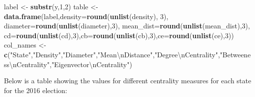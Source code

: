 \documentclass[]{article}
\newenvironment{Shaded}{\begin{snugshade}}{\end{snugshade}}
\newcommand{\KeywordTok}[1]{\textcolor[rgb]{0.13,0.29,0.53}{\textbf{#1}}}
\newcommand{\DataTypeTok}[1]{\textcolor[rgb]{0.13,0.29,0.53}{#1}}
\newcommand{\DecValTok}[1]{\textcolor[rgb]{0.00,0.00,0.81}{#1}}
\newcommand{\CharTok}[1]{\textcolor[rgb]{0.31,0.60,0.02}{#1}}
\newcommand{\StringTok}[1]{\textcolor[rgb]{0.31,0.60,0.02}{#1}}
\newcommand{\OtherTok}[1]{\textcolor[rgb]{0.56,0.35,0.01}{#1}}
\newcommand{\OperatorTok}[1]{\textcolor[rgb]{0.81,0.36,0.00}{\textbf{#1}}}
\newcommand{\NormalTok}[1]{#1}
\begin{document}
\begin{Shaded}
\begin{Highlighting}[]
\NormalTok{label <-}\StringTok{ }\KeywordTok{substr}\NormalTok{(y,}\DecValTok{1}\NormalTok{,}\DecValTok{2}\NormalTok{)}
\NormalTok{table <-}\StringTok{ }\KeywordTok{data.frame}\NormalTok{(label,}\DataTypeTok{density=}\KeywordTok{round}\NormalTok{(}\KeywordTok{unlist}\NormalTok{(density), }\DecValTok{3}\NormalTok{), }\DataTypeTok{diameter=}\KeywordTok{round}\NormalTok{(}\KeywordTok{unlist}\NormalTok{(diameter),}\DecValTok{3}\NormalTok{), }\DataTypeTok{mean_dist=}\KeywordTok{round}\NormalTok{(}\KeywordTok{unlist}\NormalTok{(mean_dist),}\DecValTok{3}\NormalTok{), }\DataTypeTok{cd=}\KeywordTok{round}\NormalTok{(}\KeywordTok{unlist}\NormalTok{(cd),}\DecValTok{3}\NormalTok{),}\DataTypeTok{cb=}\KeywordTok{round}\NormalTok{(}\KeywordTok{unlist}\NormalTok{(cb),}\DecValTok{3}\NormalTok{),}\DataTypeTok{ce=}\KeywordTok{round}\NormalTok{(}\KeywordTok{unlist}\NormalTok{(ce),}\DecValTok{3}\NormalTok{))}
\NormalTok{col_names <-}\StringTok{ }\KeywordTok{c}\NormalTok{(}\StringTok{"State"}\NormalTok{,}\StringTok{"Density"}\NormalTok{,}\StringTok{"Diameter"}\NormalTok{,}\StringTok{"Mean}\CharTok{\textbackslash{}n}\StringTok{Distance"}\NormalTok{,}\StringTok{"Degree}\CharTok{\textbackslash{}n}\StringTok{Centrality"}\NormalTok{,}\StringTok{"Betweeness}\CharTok{\textbackslash{}n}\StringTok{Centrality"}\NormalTok{,}\StringTok{"Eigenvector}\CharTok{\textbackslash{}n}\StringTok{Centrality"}\NormalTok{)}
\end{Highlighting}
\end{Shaded}

Below is a table showing the values for different centrality measures
for each state for the 2016 election:

\begin{Shaded}
\end{Shaded}
\end{document}
